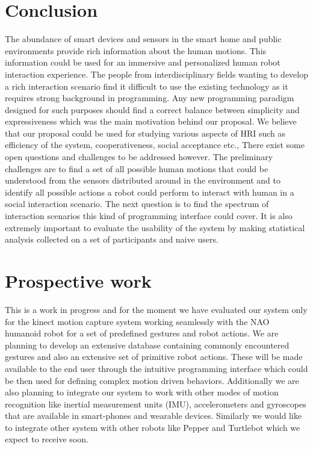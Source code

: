 \documentclass{llncs}
\begin{document}
\section{Conclusion}
The abundance of smart devices and sensors in the smart home and public environments provide rich information about the human motions. This information could be used for an immersive and personalized human robot interaction experience. The people from interdisciplinary fields wanting to develop a rich interaction scenario find it difficult to use the existing technology as it requires strong background in programming. Any new programming paradigm designed for such purposes should find a correct balance between simplicity and expressiveness which was the main motivation behind our proposal. We believe that our proposal could be used for studying various aspects of HRI such as efficiency of the system, cooperativeness, social acceptance etc., There exist some open questions and challenges to be addressed however. The preliminary challenges are to find a set of all possible human motions that could be understood from the sensors distributed around in the environment and to identify all possible actions a robot could perform to interact with human in a social interaction scenario. The next question is to find the spectrum of interaction scenarios this kind of programming interface could cover. It is also extremely important to evaluate the usability of the system by making statistical analysis collected on a set of participants and naive users.
\section{Prospective work}
	This is a work in progress and for the moment we have evaluated our system only for the kinect motion capture system working seamlessly with the NAO humanoid robot for a set of predefined gestures and robot actions. We are planning to develop an extensive database containing commonly encountered gestures and also an extensive set of primitive robot actions. These will be made available to the end user through the intuitive programming interface which could be then used for defining complex motion driven behaviors. Additionally we are also planning to integrate our system to work with other modes of motion recognition like inertial measurement units (IMU), accelerometers and gyroscopes that are available in smart-phones and wearable devices. Similarly we would like to integrate other system with other robots like Pepper and Turtlebot which we expect to receive soon.
\end{document}
